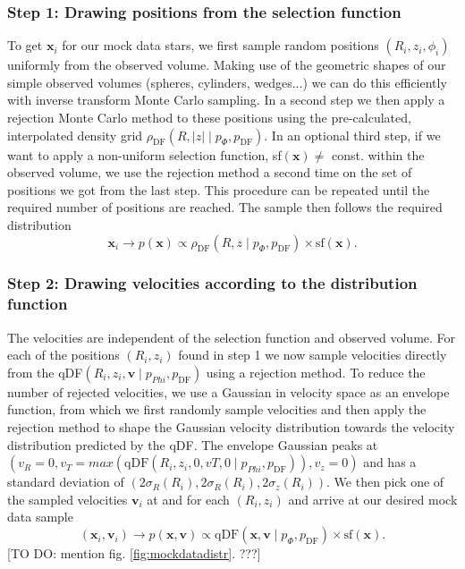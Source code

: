 \documentclass[12pt,preprint]{aastex}
\newcommand{\vect}[1]{\boldsymbol{#1}} %
\begin{document}
\subsubsection{Step 1: Drawing positions from the selection function}

To get $\vect{x}_i$ for our mock data stars, we first sample random positions $(R_i,z_i,\phi_i)$ uniformly from the observed volume. Making use of the geometric shapes of our simple observed volumes (spheres, cylinders, wedges...) we can do this efficiently with inverse transform Monte Carlo sampling. In a second step we then apply a rejection Monte Carlo method to these positions using the pre-calculated, interpolated density grid $\rho_\text{DF}(R,|z| \mid p_{\Phi},p_\text{DF})$. In an optional third step, if we want to apply a non-uniform selection function, sf$(\vect{x}) \neq $ const. within the observed volume, we use the rejection method a second time on the set of positions we got from the last step. This procedure can be repeated until the required number of positions are reached. The sample then follows the required distribution
\begin{equation*}
\vect{x}_i \longrightarrow p(\vect{x}) \propto \rho_\text{DF}(R,z \mid p_{\Phi},p_\text{DF}) \times \text{sf}(\vect{x}).
\end{equation*}

\subsubsection{Step 2: Drawing velocities according to the distribution function}

The velocities are independent of the selection function and observed volume. For each of the positions $(R_i,z_i)$ found in step 1 we now sample velocities directly from the qDF$(R_i,z_i,\vect{v} \mid p_{Phi},p_\text{DF})$ using a rejection method. To reduce the number of rejected velocities, we use a Gaussian in velocity space as an envelope function, from which we first randomly sample velocities and then apply the rejection method to shape the Gaussian velocity distribution towards the velocity distribution predicted by the qDF. The envelope Gaussian peaks at $(v_R=0,v_T=max(\text{qDF}(R_i,z_i,0,vT,0 \mid p_{Phi},p_\text{DF})),v_z=0)$ and has a standard deviation of $(2\sigma_R(R_i),2\sigma_R(R_i),2\sigma_z(R_i))$. We then pick one of the sampled velocities $\vect{v}_i$ at and for each $(R_i,z_i)$ and arrive at our desired mock data sample
\begin{equation*}
(\vect{x}_i,\vect{v}_i) \longrightarrow p(\vect{x},\vect{v}) \propto \text{qDF}(\vect{x},\vect{v} \mid p_{\Phi},p_\text{DF}) \times \text{sf}(\vect{x}).
\end{equation*} 
[TO DO: mention fig. \ref{fig:mockdatadistr}. ???]
\end{document}
